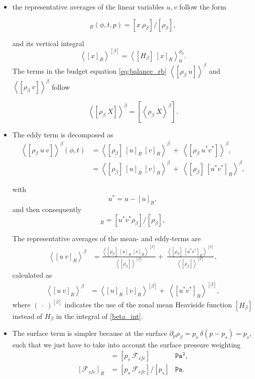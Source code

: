 \documentclass[11pt]{article}
\numberwithin{equation}{section}
\newcommand{\beq}{\begin{equation}}
\newcommand{\eeq}{\end{equation}}
\newcommand{\beqs}{\begin{equation*}}
\newcommand{\eeqs}{\end{equation*}}
\newcommand{\la}{\langle}
\newcommand{\ra}{\rangle}
\newcommand{\lara}[1]{\left\la{#1}\right\ra}
\newcommand{\rb}{\rho_\beta}
\begin{document}
\begin{itemize}

\item the representative averages of the linear variables $u, v$ follow the form %


\beq
[x]_R(\phi, t, p)=  [x~ \rb ]/ [ \rb], 
\eeq

and its vertical integral 
\beq
\lara{[x]_R}^{[\beta]} = \lara{ [H_\beta]~[x]_R}_0^{p_0}.
\eeq
The terms in the budget equation \eqref{eq:balance_rb}  $\lara{[\rb~ u]}^\beta$ and $\lara{ [\rb~ v]}^\beta$ follow

\beq
\lara{[\rb ~X]}^\beta =  [\lara{\rb ~X}^\beta].
\eeq


\item The eddy term is decomposed as
\begin{align}
\lara{[\rb~ u ~v]}^\beta(\phi, t) &=\lara{ [\rb]~[u]_R~[v]_R }^\beta~ +~\lara{[\rb~ u^* v^{*}]}^\beta, \nonumber \\
			&=\lara{ [\rb]~[u]_R~[v]_R }^\beta~ +~\lara{[\rb]~ [u^* v^*]_R}^\beta,
\end{align}

with 
\beqs
u^* = u - [u]_R,
\eeqs
and then consequently
\beqs
[u^* v^*]_R = [u^* v^*\rb ] /[\rb],
\eeqs


The representative averages of the mean- and eddy-terms are
\begin{align}
\lara{[u~ v]_R}^\beta &=\frac{ \lara{ [\rb]~[u]_R~[v]_R }^{[\beta]}  }{ \lara{[\rb]}^{[\beta]}  }  +~\frac{\lara{[\rb]~ [u^* v^*]_R}^{[\beta]}}{ \lara{[\rb]}^{[\beta]} } ,
\end{align}
calculated as 
\begin{align}
\lara{[u~ v]_R}^\beta &=\lara{ [u]_R~[v]_R  }^{[\beta]}  +~ \lara{  [u^* v^*]_R }^{[\beta]} ,
\end{align}
where $(~\cdot~)^{[\beta]}$ indicates the use of the zonal mean Heaviside function $[H_\beta]$ instead of $H_\beta$ in the integral of \eqref{beta_int}.

\item The surface term is simpler because at the surface $\partial_p \rb = p_s ~\delta(p- p_s) = p_s$, such that we just have to take into account the surface pressure weighting
\begin{align*}
[\rb ~\mathcal{F}_{sfc}] &= [p_s~  \mathcal{F}_{sfc}]   &\mathtt{Pa^2},\\
[\mathcal{F}_{sfc}]_R &= [p_s~  \mathcal{F}_{sfc}] / [p_s]   &\mathtt{Pa}.
\end{align*}


\end{itemize}
\end{document}
